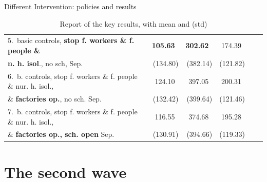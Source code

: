 \documentclass[8pt]{beamer}
\begin{document}
\begin{frame}{Different Intervention: policies and results}
\begin{table}[H]
\begin{tabular}{lrrrrr}
5.~basic controls, \textbf{stop f. workers \&  f. people \&}    & \textbf{{\color{orange}105.63}}~    &  \textbf{{\color{orange}302.62}}~      &  174.39~   \\
\textbf{ n. h. isol}., no sch, Sep.                                              &   (134.80)   &     (382.14)          &  (121.82) \\
 \midrule
6.~b. controls, stop f. workers \&  f. people \& nur. h. isol.,  &  124.10~    &    397.05~           &  200.31~    \\
\& \textbf{factories op.}, no sch. Sep.                                               &  (132.42)   &    (399.64)           &  (121.46) \\
\midrule
7.~b. controls, stop f. workers  \&  f. people \& nur. h. isol.,   &  116.55~   &    374.68~           &  195.28~    \\
 \& \textbf{factories op., sch. open} Sep.                                            &  (130.91) &     (394.66)           &  (119.33) \\
\bottomrule
\end{tabular}
\caption{Report of the key results, with mean and (std)}
\label{keyResultsT}
\end{table}



\end{frame}

\section{The second wave}
\end{document}
